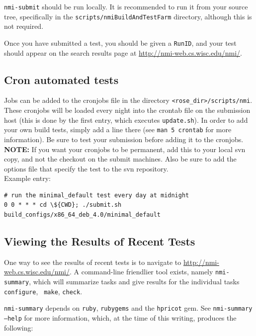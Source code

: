 {\tt nmi-submit} should be run locally.  It is recommended to run it from your
source tree, specifically in the {\tt scripts/nmiBuildAndTestFarm} directory,
although this is not required.

Once you have submitted a test, you should be given a {\tt RunID}, and your test
should appear on the search results page at
\url{http://nmi-web.cs.wisc.edu/nmi/}.


\subsection{Cron automated tests}%
Jobs can be added to the cronjobs file in the directory {\tt <rose\_dir>/scripts/nmi}. 
These cronjobs will be loaded every night into the
crontab file on the submission host (this is done by the first entry, which
executes {\tt update.sh}). In order to add your own build tests, simply add a
line there (see {\tt man 5 crontab} for more information). Be sure to test your
submission before adding it to the cronjobs.\\

{\bf NOTE:} If you want your cronjobs to be permanent, add this to your local svn
copy, and not the checkout on the submit machines. Also be sure to add the 
options file that specify the test to the svn repository.\\

Example entry:
\begin{verbatim}
# run the minimal_default test every day at midnight
0 0 * * * cd \${CWD}; ./submit.sh build_configs/x86_64_deb_4.0/minimal_default
\end{verbatim}%


\subsection{Viewing the Results of Recent Tests}
\label{sec:nmi-summary}

One way to see the results of recent tests is to navigate to
\url{http://nmi-web.cs.wisc.edu/nmi/}.
A command-line friendlier tool exists, namely {\tt nmi-summary}, which will
summarize tasks and give results for the individual tasks {\tt configure}, {\tt
make}, {\tt check}.

{\tt nmi-summary} depends on {\tt ruby}, {\tt rubygems} and the {\tt hpricot}
gem.  See {\tt nmi-summary --help} for more information, which, at the time of
this writing, produces the following:

